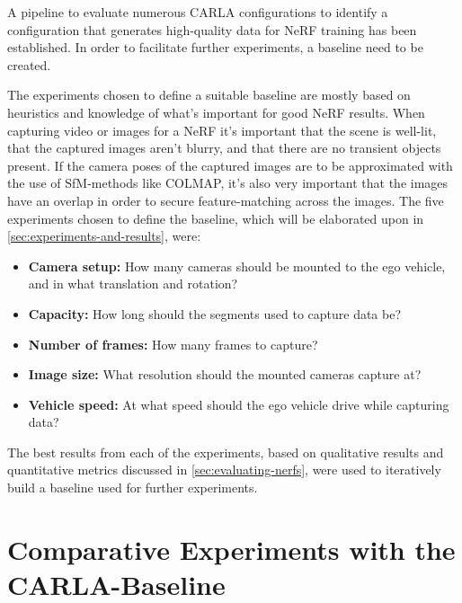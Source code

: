 A pipeline to evaluate numerous CARLA configurations to identify a configuration that generates high-quality data for NeRF training has been established. In order to facilitate further experiments, a baseline need to be created.

The experiments chosen to define a suitable baseline are mostly based on heuristics and knowledge of what's important for good NeRF results. When capturing video or images for a NeRF it’s important that the scene is well-lit, that the captured images aren't blurry, and that there are no transient objects present. If the camera poses of the captured images are to be approximated with the use of SfM-methods like COLMAP, it's also very important that the images have an overlap in order to secure feature-matching across the images. The five experiments chosen to define the baseline, which will be elaborated upon in \autoref{sec:experiments-and-results}, were:

\begin{itemize}
    \item \textbf{Camera setup:} How many cameras should be mounted to the ego vehicle, and in what translation and rotation?
    \item \textbf{Capacity:} How long should the segments used to capture data be?
    \item \textbf{Number of frames:} How many frames to capture?
    \item \textbf{Image size:} What resolution should the mounted cameras capture at?
    \item \textbf{Vehicle speed:} At what speed should the ego vehicle drive while capturing data?
\end{itemize}

The best results from each of the experiments, based on qualitative results and quantitative metrics discussed in \autoref{sec:evaluating-nerfs}, were used to iteratively build a baseline used for further experiments.
















\section{Comparative Experiments with the CARLA-Baseline}
\begin{comment}
Premise: Have a CARLA-baseline for further experiments
Question: Which further experiments should I conduct?

\begin{itemize}
    \item Find the efficiency of pose refinement
\end{itemize}
\end{comment}


